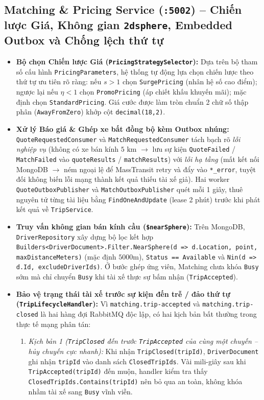\documentclass[12pt,a4paper]{article}
\begin{document}
\subsection{Matching \& Pricing Service (\texttt{:5002}) -- Chiến lược Giá, Không gian \texttt{2dsphere}, Embedded Outbox và Chống lệch thứ tự}
\begin{itemize}[nosep]
    \item \textbf{Bộ chọn Chiến lược Giá (\texttt{PricingStrategySelector}):} Dựa trên bộ tham số cấu hình \texttt{PricingParameters}, hệ thống tự động lựa chọn chiến lược theo thứ tự ưu tiên rõ ràng: nếu $s > 1$ chọn \texttt{SurgePricing} (nhân hệ số cao điểm); ngược lại nếu $\eta < 1$ chọn \texttt{PromoPricing} (áp chiết khấu khuyến mãi); mặc định chọn \texttt{StandardPricing}. Giá cước được làm tròn chuẩn 2 chữ số thập phân (\texttt{AwayFromZero}) khớp cột \texttt{decimal(18,2)}.
    \item \textbf{Xử lý Báo giá \& Ghép xe bất đồng bộ kèm Outbox nhúng:} \texttt{QuoteRequestedConsumer} và \texttt{MatchRequestedConsumer} tách bạch rõ \textit{lỗi nghiệp vụ} (không có xe bán kính $5\text{ km}$ $\rightarrow$ lưu sự kiện \texttt{QuoteFailed} / \texttt{MatchFailed} vào \texttt{quoteResults} / \texttt{matchResults}) với \textit{lỗi hạ tầng} (mất kết nối MongoDB $\rightarrow$ ném ngoại lệ để MassTransit retry và đẩy vào \texttt{*\_error}, tuyệt đối không biến lỗi mạng thành kết quả thiếu tài xế giả). Hai worker \texttt{QuoteOutboxPublisher} và \texttt{MatchOutboxPublisher} quét mỗi 1 giây, thuê nguyên tử từng tài liệu bằng \texttt{FindOneAndUpdate} (lease 2 phút) trước khi phát kết quả về \texttt{TripService}.
    \item \textbf{Truy vấn không gian bán kính cầu (\texttt{\$nearSphere}):} Trên MongoDB, \texttt{DriverRepository} xây dựng bộ lọc kết hợp \texttt{Builders<DriverDocument>.Filter.NearSphere(d => d.Location, point, maxDistanceMeters)} (mặc định $5000\text{m}$), \texttt{Status == Available} và \texttt{Nin(d => d.Id, excludeDriverIds)}. Ở bước ghép ứng viên, Matching chưa khóa \texttt{Busy} sớm mà chỉ chuyển \texttt{Busy} khi tài xế thực sự bấm nhận (\texttt{TripAccepted}).
    \item \textbf{Bảo vệ trạng thái tài xế trước sự kiện đến trễ / đảo thứ tự (\texttt{TripLifecycleHandler}):} Vì \texttt{matching.trip-accepted} và \texttt{matching.trip-closed} là hai hàng đợi RabbitMQ độc lập, có hai kịch bản bất thường trong thực tế mạng phân tán:
    \begin{enumerate}[nosep]
        \item \textit{Kịch bản 1 (\texttt{TripClosed} đến trước \texttt{TripAccepted} của cùng một chuyến -- hủy chuyến cực nhanh):} Khi nhận \texttt{TripClosed(tripId)}, \texttt{DriverDocument} ghi nhận \texttt{tripId} vào danh sách \texttt{ClosedTripIds}. Vài mili-giây sau khi \texttt{TripAccepted(tripId)} đến muộn, handler kiểm tra thấy \texttt{ClosedTripIds.Contains(tripId)} nên bỏ qua an toàn, không khóa nhầm tài xế sang \texttt{Busy} vĩnh viễn.

\end{enumerate}
\end{itemize}
\end{document}
